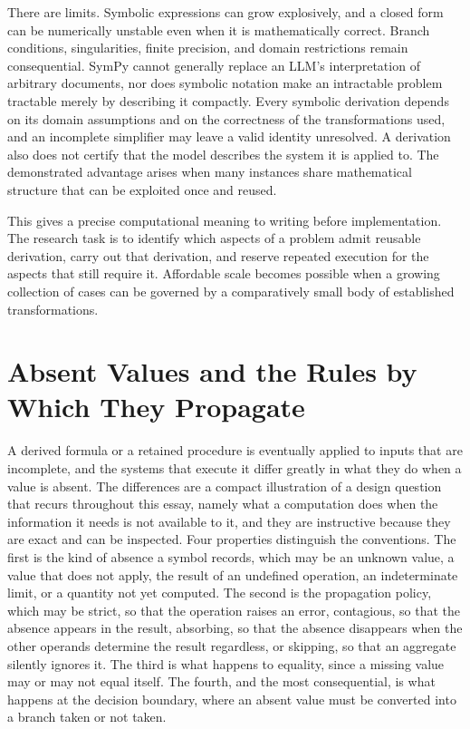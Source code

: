 \documentclass[11pt]{article}
\theoremstyle{remark}
\begin{document}
There are limits. Symbolic expressions can grow explosively, and a closed form can be numerically unstable even when it is mathematically correct. Branch conditions, singularities, finite precision, and domain restrictions remain consequential. SymPy cannot generally replace an LLM's interpretation of arbitrary documents, nor does symbolic notation make an intractable problem tractable merely by describing it compactly. Every symbolic derivation depends on its domain assumptions and on the correctness of the transformations used, and an incomplete simplifier may leave a valid identity unresolved. A derivation also does not certify that the model describes the system it is applied to. The demonstrated advantage arises when many instances share mathematical structure that can be exploited once and reused.

This gives a precise computational meaning to writing before implementation. The research task is to identify which aspects of a problem admit reusable derivation, carry out that derivation, and reserve repeated execution for the aspects that still require it. Affordable scale becomes possible when a growing collection of cases can be governed by a comparatively small body of established transformations.

\section{Absent Values and the Rules by Which They Propagate}\label{sec:absence}

A derived formula or a retained procedure is eventually applied to inputs that are incomplete, and the systems that execute it differ greatly in what they do when a value is absent. The differences are a compact illustration of a design question that recurs throughout this essay, namely what a computation does when the information it needs is not available to it, and they are instructive because they are exact and can be inspected. Four properties distinguish the conventions. The first is the kind of absence a symbol records, which may be an unknown value, a value that does not apply, the result of an undefined operation, an indeterminate limit, or a quantity not yet computed. The second is the propagation policy, which may be strict, so that the operation raises an error, contagious, so that the absence appears in the result, absorbing, so that the absence disappears when the other operands determine the result regardless, or skipping, so that an aggregate silently ignores it. The third is what happens to equality, since a missing value may or may not equal itself. The fourth, and the most consequential, is what happens at the decision boundary, where an absent value must be converted into a branch taken or not taken.
\end{document}
